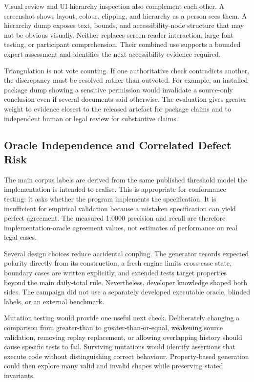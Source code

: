 Visual review and UI-hierarchy inspection also complement each other. A screenshot shows layout, colour, clipping, and hierarchy as a person sees them. A hierarchy dump exposes text, bounds, and accessibility-node structure that may not be obvious visually. Neither replaces screen-reader interaction, large-font testing, or participant comprehension. Their combined use supports a bounded expert assessment and identifies the next accessibility evidence required.

Triangulation is not vote counting. If one authoritative check contradicts another, the discrepancy must be resolved rather than outvoted. For example, an installed-package dump showing a sensitive permission would invalidate a source-only conclusion even if several documents said otherwise. The evaluation gives greater weight to evidence closest to the released artefact for package claims and to independent human or legal review for substantive claims.

\subsection{Oracle Independence and Correlated Defect Risk}

The main corpus labels are derived from the same published threshold model the implementation is intended to realise. This is appropriate for conformance testing: it asks whether the program implements the specification. It is insufficient for empirical validation because a mistaken specification can yield perfect agreement. The measured 1.0000 precision and recall are therefore implementation-oracle agreement values, not estimates of performance on real legal cases.

Several design choices reduce accidental coupling. The generator records expected polarity directly from its construction, a fresh engine limits cross-case state, boundary cases are written explicitly, and extended tests target properties beyond the main daily-total rule. Nevertheless, developer knowledge shaped both sides. The campaign did not use a separately developed executable oracle, blinded labels, or an external benchmark.

Mutation testing would provide one useful next check. Deliberately changing a comparison from greater-than to greater-than-or-equal, weakening source validation, removing replay replacement, or allowing overlapping history should cause specific tests to fail. Surviving mutations would identify assertions that execute code without distinguishing correct behaviour. Property-based generation could then explore many valid and invalid shapes while preserving stated invariants.

